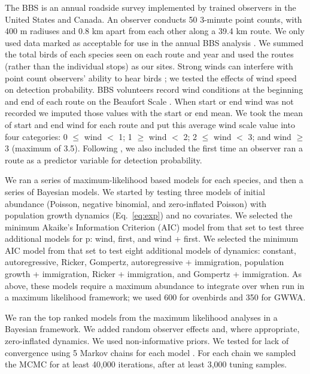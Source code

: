 \documentclass[12pt]{article}
\begin{document}
The BBS is an annual roadside survey implemented by trained observers 
in the United States and Canada. An observer conducts 50 3-minute point counts, 
with 400 m radiuses and 0.8 km apart from each other along a 39.4 km route. 
We only used data marked as acceptable for use in the annual BBS analysis 
\citep{sauer_etal:1994auk}.  We summed the total birds of each
species seen on each route and year and used the routes (rather than
the individual stops) as our sites.
Strong winds can interfere with point count observers' ability to hear
birds \citep{simons_etal:2007}; we tested the effects of wind speed
on detection probability.  BBS volunteers record wind conditions at
the beginning and end of each route on the Beaufort Scale
\citep[start and end wind 0-9]{robbins_etal:1986}.
When
start or end wind was not recorded we imputed those values with the
start or end mean.  We took the mean of start and end wind for each
route and put this average wind scale value into four categories: 0 $\leq$
wind $<$ 1; 1 $\geq$ wind $<$ 2; 2 $\leq$ wind $<$ 3; and wind $\geq$ 3 (maximum of 3.5).
Following \citet{link_sauer:2002},
we also included the first time an
observer ran a route as a predictor variable for detection
probability.

We ran a series of maximum-likelihood based models for each species,
and then a series of Bayesian models.  We started by testing three
models of initial abundance (Poisson, negative binomial, and
zero-inflated Poisson) with population growth dynamics (Eq.~\ref{eq:exp})
and no covariates.  We selected the minimum Akaike's Information
Criterion (AIC) model from that set to test three additional models
for p: wind, first, and wind + first.   We selected the minimum AIC
model from that set to test eight additional models of dynamics:
constant, autoregressive, Ricker, Gompertz, autoregressive +
immigration, population growth + immigration, Ricker + immigration,
and Gompertz + immigration.  %
As above, these models require a maximum abundance to integrate over
when run in a maximum likelihood
framework; we used 600 for ovenbirds and 350
for GWWA.

We ran the top ranked models from the maximum likelihood analyses in a
Bayesian framework.  We added random observer effects and, where
appropriate, zero-inflated dynamics.  We used
non-informative priors.  We tested for lack of convergence using 5
Markov chains for each model \citep{gelman_rubin:1992}.
For each chain
we sampled the MCMC for at least 40,000 iterations, after at least 3,000 tuning samples.  
\end{document}
